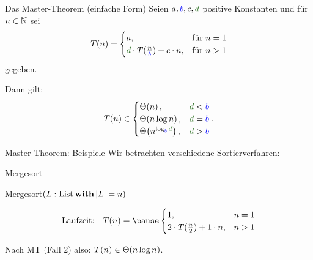 
\begin{frame}{Das Master-Theorem (einfache Form)} %
	Seien $a, \textcolor{blue}{b}, c, \textcolor{darkgreen}{d}$ positive Konstanten und für $n \in \mathbb{N}$ sei 
	\[
	T(n) = 
	\begin{cases}
	a,  & \text{für } n = 1 \\
	\textcolor{darkgreen}{d} \cdot T\large(\frac{n}{\textcolor{blue}{b}}\large) + c\·n, & \text{für } n > 1
	\end{cases}
	\]
	gegeben. \\ \smallskip
	
	Dann gilt:
	\[
	T(n) \in 
	\begin{cases}
	\Th{n},                                                        & \textcolor{darkgreen}{d} < \textcolor{blue}{b} \\
	\Th{n \log n},                                                 & \textcolor{darkgreen}{d} = \textcolor{blue}{b} \\
	\Th{n^{\log _{\textcolor{blue}{b}} \textcolor{darkgreen}{d}}}, & \textcolor{darkgreen}{d} > \textcolor{blue}{b}
	\end{cases}.
	\]
\end{frame}

\begin{frame}[t]{Master-Theorem: Beispiele} 
	Wir betrachten verschiedene Sortierverfahren:\\
	\bigskip
	
	\begin{exampleblock}{Mergesort}
		\begin{algorithm}[H]
			\KwMethod Mergesort$(L: \|List| \: \KwSty{with} \size{L} = n)$
		\end{algorithm}
	\end{exampleblock}	
	
	\[\text{Laufzeit:} \quad T(n) = \pause \begin{cases}
	1, & n = 1\\
	2 \cdot T(\fract n/2 ) + 1 \cdot n, & n > 1
	\end{cases}\]
	
	\pause
	Nach MT (Fall 2) also: $T(n) \in \Theta\!\left(n \log n\right)$.
\end{frame}

